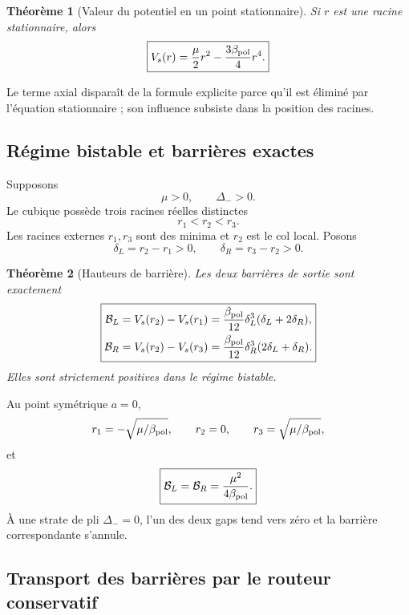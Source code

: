 \documentclass[11pt,a4paper]{article}
\newtheorem{theorem}{Théorème}[section]
\begin{document}
\begin{theorem}[Valeur du potentiel en un point stationnaire]\label{thm:v24-critical-value}
Si $r$ est une racine stationnaire, alors
\begin{equation}\label{eq:v24-critical-value}
 \boxed{
 V_s(r)
 =
 \frac\mu2r^2
 -\frac{3\beta_{\rm pol}}4r^4.}
\end{equation}
\end{theorem}

Le terme axial disparaît de la formule explicite parce qu'il est éliminé par l'équation stationnaire ; son influence subsiste dans la position des racines.

\subsection{Régime bistable et barrières exactes}

Supposons
\[
 \mu>0,
 \qquad
 \Delta_->0.
\]
Le cubique possède trois racines réelles distinctes
\[
 r_1<r_2<r_3.
\]
Les racines externes $r_1,r_3$ sont des minima et $r_2$ est le col local. Posons
\[
 \delta_L=r_2-r_1>0,
 \qquad
 \delta_R=r_3-r_2>0.
\]

\begin{theorem}[Hauteurs de barrière]\label{thm:v24-barriers}
Les deux barrières de sortie sont exactement
\begin{equation}\label{eq:v24-barriers}
 \boxed{
 \begin{aligned}
 \mathcal B_L
 &=V_s(r_2)-V_s(r_1)
 =\frac{\beta_{\rm pol}}{12}
 \delta_L^3(\delta_L+2\delta_R),\\
 \mathcal B_R
 &=V_s(r_2)-V_s(r_3)
 =\frac{\beta_{\rm pol}}{12}
 \delta_R^3(2\delta_L+\delta_R).
 \end{aligned}}
\end{equation}
Elles sont strictement positives dans le régime bistable.
\end{theorem}

Au point symétrique $a=0$,
\[
 r_1=-\sqrt{\mu/\beta_{\rm pol}},
 \qquad
 r_2=0,
 \qquad
 r_3=\sqrt{\mu/\beta_{\rm pol}},
\]
et
\begin{equation}\label{eq:v24-symmetric-barrier}
 \boxed{
 \mathcal B_L=\mathcal B_R
 =\frac{\mu^2}{4\beta_{\rm pol}}.}
\end{equation}
À une strate de pli $\Delta_-=0$, l'un des deux gaps tend vers zéro et la barrière correspondante s'annule.

\subsection{Transport des barrières par le routeur conservatif}
\end{document}
